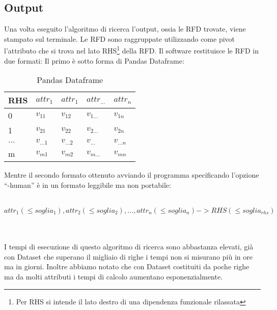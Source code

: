 \subsection{Output}
Una volta eseguito l’algoritmo di ricerca l’output, ossia le RFD trovate, viene stampato sul terminale. Le RFD sono raggruppate utilizzando come pivot l’attributo che si trova nel lato RHS\footnote{Per RHS si intende il lato destro di una dipendenza funzionale rilassata} della RFD. Il software restituisce le RFD in due formati:
Il primo è sotto forma di Pandas Dataframe:
\begin{table}[h]
    \centering
    \begin{tabular}{l  l  l  l  l }
     RHS & $attr_1$ & $attr_1$ &$attr_{\ldots}$ & $attr_n$ \\
    \hline
    0 & $v_{11}$ & $v_{12}$ & $v_{1\ldots}$ & $v_{1n}$\\
    1 & $v_{21}$ & $v_{22}$ & $v_{2\ldots}$ & $v_{2n}$\\
    $\ldots$ & $v_{\ldots1}$ & $v_{\ldots2}$ & $v_{\ldots}$ & $v_{\ldots n}$\\
    m & $v_{m1}$ & $v_{m2}$ & $v_{m\ldots}$ & $v_{mn}$\\
    \end{tabular}
    \caption{Pandas Dataframe}
    \label{tab:pandas_dataframe}
\end{table}


Mentre il secondo formato ottenuto avviando il programma specificando l’opzione “-human” è in un formato leggibile ma non portabile:
\\~\\
\centerline{$attr_1(\leq soglia_1),attr_2(\leq soglia_2),\ldots,{attr_n}(\leq soglia_n)->RHS(\leq soglia_{rhs})$}
\\~\\
I tempi di esecuzione di questo algoritmo di ricerca sono abbastanza elevati, già con Dataset che superano il migliaio di righe i tempi non si misurano più in ore ma in giorni. Inoltre abbiamo notato che con Dataset costituiti da poche righe ma da molti attributi i tempi di calcolo aumentano esponenzialmente.